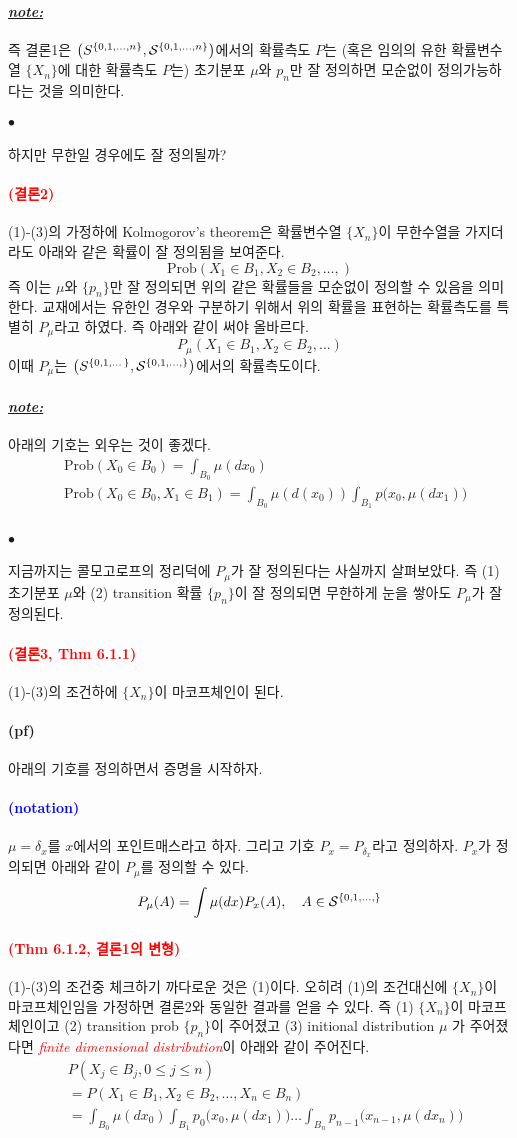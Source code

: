 \documentclass[12pt,oneside,english]{book}
\def\ck{\paragraph{\Large$\bullet$}\Large}
\def\pf{\paragraph{\Large(pf)}\Large}
\def\note{\paragraph{\Large\textit{\underline{note:}}}\Large}
\newcommand{\parablue}[1]{\paragraph{\Large\textcolor{blue}{(#1)}}\Large}
\newcommand{\parared}[1]{\paragraph{\Large\textcolor{red}{(#1)}}\Large}
\begin{document}
\note 즉 결론1은 $\left(S^{\{0,1,\dots,n\}},{\cal S}^{\{0,1,\dots,n\}}\right)$에서의 확률측도 $P$는 (혹은 임의의 유한 확률변수열 $\{X_n\}$에 대한 확률측도 $P$는) 초기분포 $\mu$와 $p_n$만 잘 정의하면 모순없이 정의가능하다는 것을 의미한다.

\ck 하지만 무한일 경우에도 잘 정의될까? 

\parared{결론2} (1)-(3)의 가정하에 Kolmogorov's theorem은 확률변수열 $\{X_n\}$이 무한수열을 가지더라도 아래와 같은 확률이 잘 정의됨을 보여준다. 
\[
\mbox{Prob}(X_1\in B_1, X_2\in B_2, \dots, )
\]
즉 이는 $\mu$와 $\{p_n\}$만 잘 정의되면 위의 같은 확률들을 모순없이 정의할 수 있음을 의미한다. 교재에서는 유한인 경우와 구분하기 위해서 위의 확률을 표현하는 확률측도를 특별히 $P_{\mu}$라고 하였다. 즉 아래와 같이 써야 올바르다. 
\[
P_{\mu}(X_1\in B_1, X_2\in B_2, \dots)
\]
이때 $P_{\mu}$는 $\left(S^{\{0,1,\dots\}},{\cal S}^{\{0,1,\dots,\}}\right)$에서의 확률측도이다. 

\note 아래의 기호는 외우는 것이 좋겠다. 
\begin{align*}
& \mbox{Prob}(X_0\in B_0)= \int_{B_0} \mu(dx_0)\\ 
& \mbox{Prob}(X_0\in B_0,X_1 \in B_1)= \int_{B_0} \mu(d(x_0)) \int_{B_1} p\big(x_0,\mu(dx_1)\big) \\ 
\end{align*}

\ck 지금까지는 콜모고로프의 정리덕에 $P_{\mu}$가 잘 정의된다는 사실까지 살펴보았다. 즉 (1) 초기분포 $\mu$와 (2) transition 확률 $\{p_n\}$이 잘 정의되면 무한하게 눈을 쌓아도 $P_{\mu}$가 잘 정의된다. 

\parared{결론3, Thm 6.1.1} (1)-(3)의 조건하에 $\{X_n\}$이 마코프체인이 된다. 
\pf 아래의 기호를 정의하면서 증명을 시작하자. 
\parablue{notation}
$\mu=\delta_x$를 $x$에서의 포인트매스라고 하자. 그리고 기호 $P_x=P_{\delta_x}$라고 정의하자. $P_x$가 정의되면 아래와 같이 $P_{\mu}$를 정의할 수 있다. 
\[
P_{\mu}(A)=\int \mu(dx)P_x(A), \quad A \in {\cal S}^{\{0,1,\dots,\}}
\]

\parared{Thm 6.1.2, 결론1의 변형} (1)-(3)의 조건중 체크하기 까다로운 것은 (1)이다. 오히려 (1)의 조건대신에 $\{X_n\}$이 마코프체인임을 가정하면 결론2와 동일한 결과를 얻을 수 있다. 즉 (1) $\{X_n\}$이 마코프체인이고 (2) transition prob $\{p_n\}$이 주어졌고 (3) initional distribution $\mu$ 가 주어졌다면 \textcolor{red}{\emph{finite dimensional distribution}}이 아래와 같이 주어진다. 
\begin{align*}
& P(X_j \in B_j, 0\leq j \leq n) \\ 
& = P(X_1\in B_1, X_2\in B_2, \dots, X_n \in B_n)\\
& = \int_{B_0}\mu(dx_0)\int_{B_1}p_0\big(x_0,\mu(dx_1)\big)\dots\int_{B_n}p_{n-1}\big(x_{n-1},\mu(dx_n)\big)
\end{align*}
\end{document}
